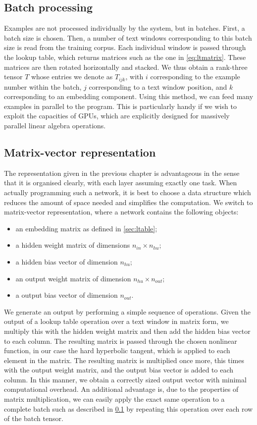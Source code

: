 \subsection{Batch processing}
\label{sec:batch}
Examples are not processed individually by the system, but in
batches. First, a batch size is chosen. Then, a number of text windows
corresponding to this batch size is read from the training
corpus. Each individual window is passed through the lookup table,
which returns matrices such as the one in \ref{eq:ltmatrix}. These
matrices are then rotated horizontally and stacked. We thus obtain a
rank-three tensor $T$ whose entries we denote as $T_{ijk}$, with $i$
corresponding to the example number within the batch, $j$
corresponding to a text window position, and $k$ corresponding to an
embedding component. Using this method, we can feed many examples in
parallel to the program. This is particularly handy if we wish to
exploit the capacities of GPUs, which are explicitly designed for
massively parallel linear algebra operations.

\subsection{Matrix-vector representation}
\label{sec:matrixvectorreps}
The representation given in the previous chapter is advantageous in
the sense that it is organised clearly, with each layer assuming
exactly one task. When actually programming such a network, it is best
to choose a data structure which reduces the amount of space needed
and simplifies the computation. We switch to matrix-vector
representation, where a network contains the following objects:

\begin{itemize}
\item an embedding matrix as defined in \ref{sec:ltable};
\item a hidden weight matrix of dimensions $n_{in} \times n_{hu}$;
\item a hidden bias vector of dimension $n_{hu}$;
\item an output weight matrix of dimension $n_{hu} \times n_{out}$;
\item a output bias vector of dimension $n_{out}$.
\end{itemize}

We generate an output by performing a simple sequence of
operations. Given the output of a lookup table operation over a text
window in matrix form, we multiply this with the hidden weight matrix
and then add the hidden bias vector to each column. The resulting
matrix is passed through the chosen nonlinear function, in our case the
hard hyperbolic tangent, which is applied to each element in the
matrix. The resulting matrix is multiplied once more, this times with
the output weight matrix, and the output bias vector is added to each
column. In this manner, we obtain a correctly sized output vector with
minimal computational overhead. An additional advantage is, due to the
properties of matrix multiplication, we can easily apply the exact
same operation to a complete batch such as described in
\ref{sec:batch} by repeating this operation over each row of the batch
tensor.

